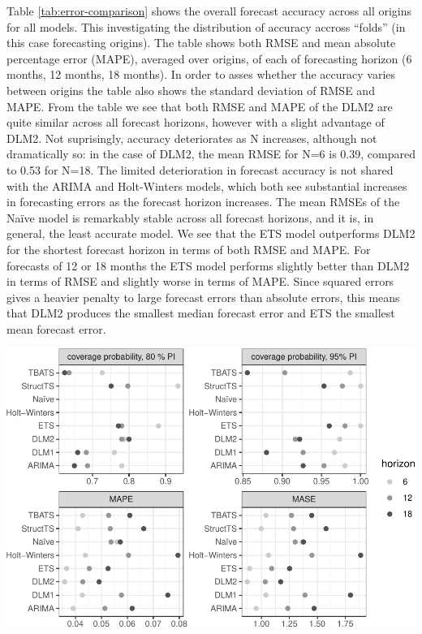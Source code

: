 \documentclass[]{article}
\begin{document}
Table \ref{tab:error-comparison} shows the overall forecast accuracy
across all origins for all models. This investigating the distribution
of accuracy accross ``folds'' (in this case forecasting origins). The
table shows both RMSE and mean absolute percentage error (MAPE),
averaged over origins, of each of forecasting horizon (6 months, 12
months, 18 months). In order to asses whether the accuracy varies
between origins the table also shows the standard deviation of RMSE and
MAPE. From the table we see that both RMSE and MAPE of the DLM2 are
quite similar across all forecast horizons, however with a slight
advantage of DLM2. Not suprisingly, accuracy deteriorates as N
increases, although not dramatically so: in the case of DLM2, the mean
RMSE for N=6 is 0.39, compared to 0.53 for N=18. The limited
deterioration in forecast accuracy is not shared with the ARIMA and
Holt-Winters models, which both see substantial increases in forecasting
errors as the forecast horizon increases. The mean RMSEs of the Naïve
model is remarkably stable across all forecast horizons, and it is, in
general, the least accurate model. We see that the ETS model outperforms
DLM2 for the shortest forecast horizon in terms of both RMSE and MAPE.
For forecasts of 12 or 18 months the ETS model performs slightly better
than DLM2 in terms of RMSE and slightly worse in terms of MAPE. Since
squared errors gives a heavier penalty to large forecast errors than
absolute errors, this means that DLM2 produces the smallest median
forecast error and ETS the smallest mean forecast error.

\includegraphics{../figs/freq--error-comparison-1.pdf}
\end{document}
